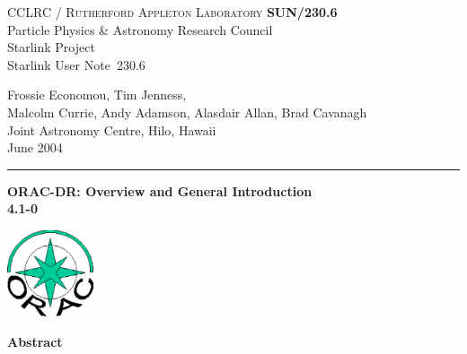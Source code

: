 \documentclass[twoside,11pt]{article}
\newcommand{\stardoccategory}  {Starlink User Note}
\newcommand{\stardocinitials}  {SUN}
\newcommand{\stardocnumber}    {230.6}
\newcommand{\stardocauthors}   {Frossie Economou, Tim Jenness,\\
Malcolm Currie, Andy Adamson, Alasdair Allan, Brad Cavanagh\\
Joint Astronomy Centre, Hilo, Hawaii}
\newcommand{\stardocdate}      {June 2004}
\newcommand{\stardoctitle}     {ORAC-DR: Overview and General Introduction}
\newcommand{\stardocversion}   {4.1-0}
\newcommand{\stardocmanual}    {}
\newcommand{\stardocname}{\stardocinitials /\stardocnumber}
\newenvironment{latexonly}{}{}
\renewcommand{\_}{\texttt{\symbol{95}}}
\begin{document}
\thispagestyle{empty}

\begin{latexonly}
   CCLRC / \textsc{Rutherford Appleton Laboratory} \hfill \textbf{\stardocname}\\
   {\large Particle Physics \& Astronomy Research Council}\\
   {\large Starlink Project\\}
   {\large \stardoccategory\ \stardocnumber}
   \begin{flushright}
   \stardocauthors\\
   \stardocdate
   \end{flushright}
   \vspace{-4mm}
   \rule{\textwidth}{0.5mm}
   \vspace{5mm}
   \begin{center}
   {\Huge\textbf{\stardoctitle \\ [2.5ex]}}
   {\LARGE\textbf{\stardocversion \\ [4ex]}}
   {\Huge\textbf{\stardocmanual}}
   \end{center}
   \vspace{5mm}

\begin{center}
\includegraphics[width=1.0in]{sun230_logo.eps}
\end{center}

   \vspace{10mm}
   \begin{center}
      {\Large\textbf{Abstract}}
   \end{center}
\end{latexonly}
\end{document}
